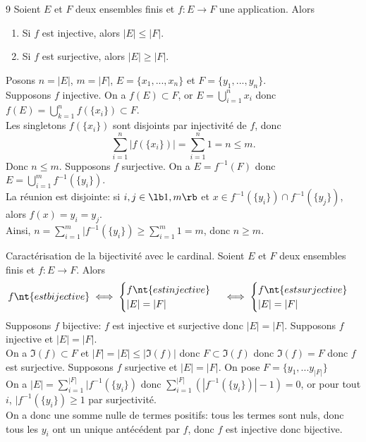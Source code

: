 \documentclass[11pt]{article}
\begin{document}
\begin{prop}{}{9}
    Soient $E$ et $F$ deux ensembles finis et $f:E\to F$ une application. Alors
    \begin{enumerate}
        \item Si $f$ est injective, alors $|E|\leq|F|$.
        \item Si $f$ est surjective, alors $|E|\geq|F|$.
    \end{enumerate}
    \tcblower
    Posons $n=|E|$, $m=|F|$, $E=\{x_1,...,x_n\}$ et $F=\{y_1,...,y_n\}$.\\ 
     Supposons $f$ injective. On a $f(E)\subset F$, or $E=\bigcup\limits_{i=1}^nx_i$ donc $f(E)=\bigcup\limits_{k=1}^nf(\{x_i\})\subset F$.\\
    Les singletons $f(\{x_i\})$ sont disjoints par injectivité de $f$, donc
    \begin{equation*}
        \sum_{i=1}^n|f(\{x_i\})|=\sum_{i=1}^n1=n\leq m.
    \end{equation*}
    Donc $n\leq m$.\n
     Supposons $f$ surjective. On a $E=f^{-1}(F)$ donc $E=\bigcup\limits_{i=1}^mf^{-1}(\{y_i\})$.\\
    La réunion est disjointe: si $i,j\in\lb1,m\rb$ et $x\in f^{-1}(\{y_i\})\cap f^{-1}(\{y_j\})$, alors $f(x)=y_i=y_j$.\\
    Ainsi, $n=\sum_{i=1}^m|f^{-1}(\{y_i\})\geq\sum_{i=1}^m1=m$, donc $n\geq m$.
\end{prop}

\begin{prop}{Caractérisation de la bijectivité avec le cardinal.}{}
    Soient $E$ et $F$ deux ensembles finis et $f:E\to F$. Alors
    \begin{equation*}
        f\nt{ est bijective} \iff \begin{cases}
            f \nt{ est injective}\\
            |E|=|F|
        \end{cases} \iff \begin{cases}
            f \nt { est surjective}\\
            |E|=|F|
        \end{cases}
    \end{equation*}
    \tcblower
     Supposons $f$ bijective: $f$ est injective et surjective donc $|E|=|F|$.\n
     Supposons $f$ injective et $|E|=|F|$.\\
    On a $\Im(f)\subset F$ et $|F|=|E|\leq|\Im(f)|$ donc $F \subset \Im(f)$ donc $\Im(f) = F$ donc $f$ est surjective.\n
     Supposons $f$ surjective et $|E|=|F|$. On pose $F=\{y_1,...y_{|F|}\}$\\
    On a $|E|=\sum\limits_{i=1}^{|F|}|f^{-1}(\{y_i\})$ donc $\sum\limits_{i=1}^{|F|}(|f^{-1}(\{y_i\})|-1)=0$, or pour tout $i$, $|f^{-1}(\{y_i\})\geq1$ par surjectivité.\\
    On a donc une somme nulle de termes positifs: tous les termes sont nuls, donc tous les $y_i$ ont un unique antécédent par $f$, donc $f$ est injective donc bijective.
\end{prop}
\end{document}
